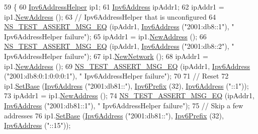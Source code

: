 \begin{DoxyCode}
59 \{
60   \hyperlink{classns3_1_1Ipv6AddressHelper}{Ipv6AddressHelper} ip1;
61   \hyperlink{classns3_1_1Ipv6Address}{Ipv6Address} ipAddr1;
62   ipAddr1 = ip1.\hyperlink{classns3_1_1Ipv6AddressHelper_a0f9499d21947758623cf17615e3dbc84}{NewAddress} ();
63   \textcolor{comment}{// Ipv6AddressHelper that is unconfigured}
64   \hyperlink{group__testing_ga2a9d78cffb3db8e867c35fff0b698cf5}{NS\_TEST\_ASSERT\_MSG\_EQ} (ipAddr1, \hyperlink{classns3_1_1Ipv6Address}{Ipv6Address} (\textcolor{stringliteral}{"2001:db8::1"}), \textcolor{stringliteral}{"
      Ipv6AddressHelper failure"});
65   ipAddr1 = ip1.\hyperlink{classns3_1_1Ipv6AddressHelper_a0f9499d21947758623cf17615e3dbc84}{NewAddress} ();
66   \hyperlink{group__testing_ga2a9d78cffb3db8e867c35fff0b698cf5}{NS\_TEST\_ASSERT\_MSG\_EQ} (ipAddr1, \hyperlink{classns3_1_1Ipv6Address}{Ipv6Address} (\textcolor{stringliteral}{"2001:db8::2"}), \textcolor{stringliteral}{"
      Ipv6AddressHelper failure"});
67   ip1.\hyperlink{classns3_1_1Ipv6AddressHelper_a7c9da1dcff52973a901dcb5c69b8c026}{NewNetwork} ();
68   ipAddr1 = ip1.\hyperlink{classns3_1_1Ipv6AddressHelper_a0f9499d21947758623cf17615e3dbc84}{NewAddress} ();
69   \hyperlink{group__testing_ga2a9d78cffb3db8e867c35fff0b698cf5}{NS\_TEST\_ASSERT\_MSG\_EQ} (ipAddr1, \hyperlink{classns3_1_1Ipv6Address}{Ipv6Address} (\textcolor{stringliteral}{"2001:db8:0:1:0:0:0:1"}), \textcolor{stringliteral}{"
      Ipv6AddressHelper failure"});
70 
71   \textcolor{comment}{// Reset}
72   ip1.\hyperlink{classns3_1_1Ipv6AddressHelper_a13467412e9da6263395c09460681c0f1}{SetBase} (\hyperlink{classns3_1_1Ipv6Address}{Ipv6Address} (\textcolor{stringliteral}{"2001:db81::"}), \hyperlink{classns3_1_1Ipv6Prefix}{Ipv6Prefix} (32), 
      \hyperlink{classns3_1_1Ipv6Address}{Ipv6Address} (\textcolor{stringliteral}{"::1"}));
73   ipAddr1 = ip1.\hyperlink{classns3_1_1Ipv6AddressHelper_a0f9499d21947758623cf17615e3dbc84}{NewAddress} ();
74   \hyperlink{group__testing_ga2a9d78cffb3db8e867c35fff0b698cf5}{NS\_TEST\_ASSERT\_MSG\_EQ} (ipAddr1, \hyperlink{classns3_1_1Ipv6Address}{Ipv6Address} (\textcolor{stringliteral}{"2001:db81::1"}), \textcolor{stringliteral}{"
      Ipv6AddressHelper failure"});
75   \textcolor{comment}{// Skip a few addresses}
76   ip1.\hyperlink{classns3_1_1Ipv6AddressHelper_a13467412e9da6263395c09460681c0f1}{SetBase} (\hyperlink{classns3_1_1Ipv6Address}{Ipv6Address} (\textcolor{stringliteral}{"2001:db81::"}), \hyperlink{classns3_1_1Ipv6Prefix}{Ipv6Prefix} (32), 
      \hyperlink{classns3_1_1Ipv6Address}{Ipv6Address} (\textcolor{stringliteral}{"::15"}));

\end{DoxyCode}
